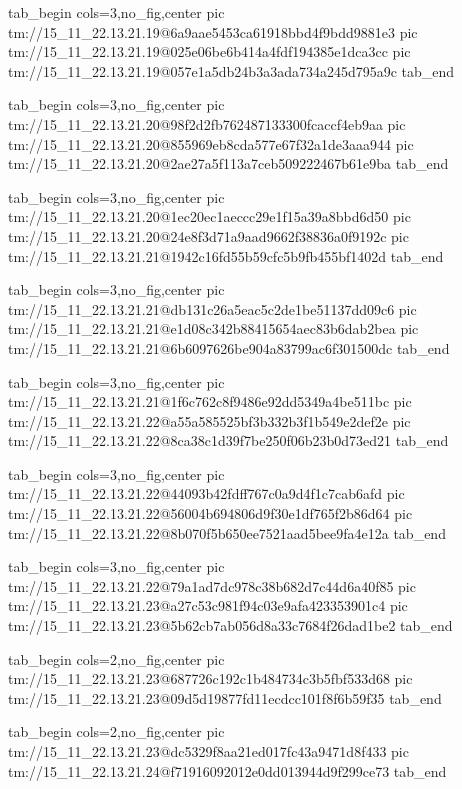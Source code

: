  
 
 
 
 

\qqSecCmtScr


\ifcmt
  tab_begin cols=3,no_fig,center
    pic tm://15_11_22.13.21.19@6a9aae5453ca61918bbd4f9bdd9881e3
    pic tm://15_11_22.13.21.19@025e06be6b414a4fdf194385e1dca3cc
    pic tm://15_11_22.13.21.19@057e1a5db24b3a3ada734a245d795a9c
  tab_end
\fi


\ifcmt
  tab_begin cols=3,no_fig,center
    pic tm://15_11_22.13.21.20@98f2d2fb762487133300fcaccf4eb9aa
    pic tm://15_11_22.13.21.20@855969eb8cda577e67f32a1de3aaa944
    pic tm://15_11_22.13.21.20@2ae27a5f113a7ceb509222467b61e9ba
  tab_end
\fi


\ifcmt
  tab_begin cols=3,no_fig,center
    pic tm://15_11_22.13.21.20@1ec20ec1aeccc29e1f15a39a8bbd6d50
    pic tm://15_11_22.13.21.20@24e8f3d71a9aad9662f38836a0f9192c
    pic tm://15_11_22.13.21.21@1942c16fd55b59cfc5b9fb455bf1402d
  tab_end
\fi


\ifcmt
  tab_begin cols=3,no_fig,center
    pic tm://15_11_22.13.21.21@db131c26a5eac5c2de1be51137dd09c6
    pic tm://15_11_22.13.21.21@e1d08c342b88415654aec83b6dab2bea
    pic tm://15_11_22.13.21.21@6b6097626be904a83799ac6f301500dc
  tab_end
\fi


\ifcmt
  tab_begin cols=3,no_fig,center
    pic tm://15_11_22.13.21.21@1f6c762c8f9486e92dd5349a4be511bc
    pic tm://15_11_22.13.21.22@a55a585525bf3b332b3f1b549e2def2e
    pic tm://15_11_22.13.21.22@8ca38c1d39f7be250f06b23b0d73ed21
  tab_end
\fi


\ifcmt
  tab_begin cols=3,no_fig,center
    pic tm://15_11_22.13.21.22@44093b42fdff767c0a9d4f1c7cab6afd
    pic tm://15_11_22.13.21.22@56004b694806d9f30e1df765f2b86d64
    pic tm://15_11_22.13.21.22@8b070f5b650ee7521aad5bee9fa4e12a
  tab_end
\fi


\ifcmt
  tab_begin cols=3,no_fig,center
    pic tm://15_11_22.13.21.22@79a1ad7dc978c38b682d7c44d6a40f85
    pic tm://15_11_22.13.21.23@a27c53c981f94c03e9afa423353901c4
    pic tm://15_11_22.13.21.23@5b62cb7ab056d8a33c7684f26dad1be2
  tab_end
\fi


\ifcmt
  tab_begin cols=2,no_fig,center
    pic tm://15_11_22.13.21.23@687726c192c1b484734c3b5fbf533d68
    pic tm://15_11_22.13.21.23@09d5d19877fd11ecdcc101f8f6b59f35
  tab_end
\fi


\ifcmt
  tab_begin cols=2,no_fig,center
    pic tm://15_11_22.13.21.23@dc5329f8aa21ed017fc43a9471d8f433
    pic tm://15_11_22.13.21.24@f71916092012e0dd013944d9f299ce73
  tab_end
\fi

